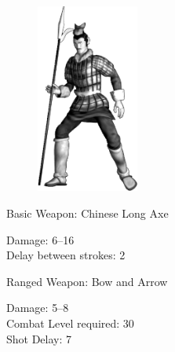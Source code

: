 \begin{figure}
	\begin{center}
		\vspace{-20pt}
		\includegraphics[width=0.3\textwidth]{Achinese}
	\end{center}
	\vspace{-20pt}
\end{figure}

Basic Weapon: Chinese Long Axe
\begin{adjustwidth}{1cm}{}
	Damage: 6–16 \\
	Delay between strokes: 2
\end{adjustwidth}
Ranged Weapon: Bow and Arrow
\begin{adjustwidth}{1cm}{}
	Damage: 5–8 \\
	Combat Level required: 30 \\
	Shot Delay: 7 \\ \\ \\ \\ \\ \\ \\ \\ 
\end{adjustwidth}

